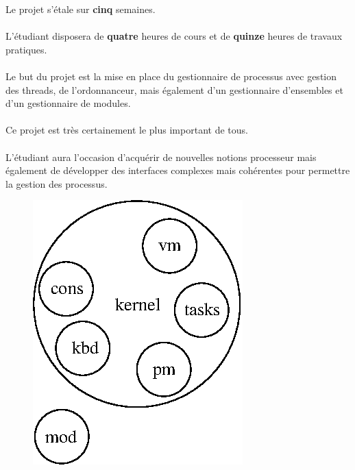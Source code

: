 \documentclass[10pt,a4wide]{article}
\begin{document}
Le projet s'\'etale sur \textbf{cinq} semaines.

\paragraph{}

L'\'etudiant disposera de \textbf{quatre} heures de cours et de \textbf{quinze}
heures de travaux pratiques.

\paragraph{}

Le but du projet est la mise en place du gestionnaire de processus avec
gestion des threads, de l'ordonnanceur, mais \'egalement d'un gestionnaire
d'ensembles et d'un gestionnaire de modules.

\paragraph{}

Ce projet est tr\`es certainement le plus important de tous.

\paragraph{}

L'\'etudiant aura l'occasion d'acqu\'erir de nouvelles notions processeur
mais \'egalement de d\'evelopper des interfaces complexes mais coh\'erentes
pour permettre la gestion des processus.

\vspace{5cm}

\begin{figure}[h]
\centerline{\includegraphics{figures/k4.eps}}
\end{figure}
\end{document}
